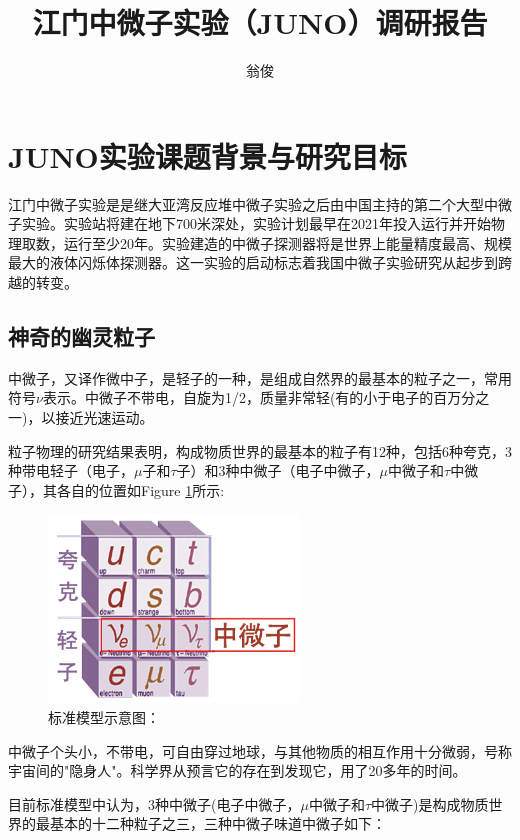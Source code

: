 \documentclass[10pt,a4paper]{article}
\author{翁俊}
\title{江门中微子实验（JUNO）调研报告}
\begin{document}
\maketitle
\newpage
\tableofcontents
\newpage

\section{JUNO实验课题背景与研究目标}

江门中微子实验是是继大亚湾反应堆中微子实验之后由中国主持的第二个大型中微子实验。实验站将建在地下700米深处，实验计划最早在2021年投入运行并开始物理取数，运行至少20年。实验建造的中微子探测器将是世界上能量精度最高、规模最大的液体闪烁体探测器。这一实验的启动标志着我国中微子实验研究从起步到跨越的转变。

	
\subsection{神奇的幽灵粒子}
中微子，又译作微中子，是轻子的一种，是组成自然界的最基本的粒子之一，常用符号$\nu$表示。中微子不带电，自旋为1/2，质量非常轻(有的小于电子的百万分之一)，以接近光速运动。



粒子物理的研究结果表明，构成物质世界的最基本的粒子有12种，包括6种夸克，3种带电轻子（电子，$\mu $子和$\tau$子）和3种中微子（电子中微子，$\mu$中微子和$\tau$中微子），其各自的位置如Figure \ref{fig:0}所示:

\begin{figure}[H]
 \centering
 \includegraphics[height=5cm]{images/standarmodel.jpg}
 \caption{标准模型示意图：}
 \label{fig:0}
\end{figure}

中微子个头小，不带电，可自由穿过地球，与其他物质的相互作用十分微弱，号称宇宙间的"隐身人"。科学界从预言它的存在到发现它，用了20多年的时间。

目前标准模型中认为，3种中微子(电子中微子，$\mu$中微子和$\tau$中微子)是构成物质世界的最基本的十二种粒子之三，三种中微子味道中微子如下：
\end{document}
